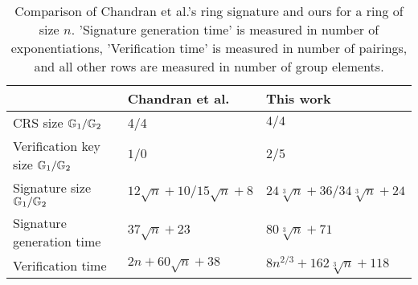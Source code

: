 
\begin{table}[h]
\begin{center}
\begin{minipage}{\textwidth}
\begin{center}
\begin{tabular}{l|l|l}
                                           & Chandran et al.~\cite{ICALP:ChaGroSah07} & This work \\
\hline%
\rule{0pt}{2.5ex}CRS size  $\mathbb{G}_1/\mathbb{G}_2$              & 4/4                                      & $4/4$       \\
\rule{0pt}{2.5ex}Verification key size $\mathbb{G}_1/\mathbb{G}_2$    & $1/0$                                       & $2/5$       \\
\rule{0pt}{2.5ex}Signature size      $\mathbb{G}_1/\mathbb{G}_2$      & $12\sqrt{n}+10/15\sqrt{n}+8$                        & $24\sqrt[3]{n} + 36/34\sqrt[3]{n} + 24$\\
\rule{0pt}{2.5ex}Signature generation time & $37\sqrt{n}+23$                        & $80\sqrt[3]{n}+71$\\
\rule{0pt}{2.5ex}Verification time         & $2n + 60\sqrt{n}+38$                & $8n^{2/3} + 162\sqrt[3]{n} + 118$\\
\end{tabular}
\end{center}
\caption{Comparison of Chandran et al.'s ring signature and ours for a ring of size $n$. 'Signature generation time' is measured in number of exponentiations, 'Verification time' is measured in number of pairings, and all other rows are measured in number of group elements.\label{table:eff}}
\end{minipage}
\end{center}
\end{table}
